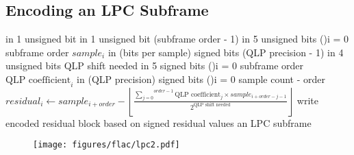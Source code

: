 \subsection{Encoding an LPC Subframe}
 in 1 unsigned bit
 in 1 unsigned bit
\WRITE (subframe order - 1) in 5 unsigned bits\;
\For(){i = 0 \emph{\KwTo}subframe order}{
  \WRITE $sample_i$ in (bits per sample) signed bits\;
}
\WRITE (QLP precision - 1) in 4 unsigned bits\;
\WRITE QLP shift needed in 5 signed bits\;
\For(){i = 0 \emph{\KwTo}subframe order}{
  \WRITE $\text{QLP coefficient}_i$ in (QLP precision) signed bits\;
}
\BlankLine
\For(){i = 0 \emph{\KwTo}sample count - order}{
  $residual_i \leftarrow sample_{i + order} - \left \lfloor \frac{\overset{order - 1}{\underset{j = 0}{\sum}} \text{QLP coefficient}_j \times sample_{i + order - j - 1} }{2 ^ \text{QLP shift needed}} \right \rfloor$
}
write encoded residual block based on signed residual values\;
\Return an LPC subframe\;
\EALGORITHM
\begin{figure}[h]
\texttt{[image: figures/flac/lpc2.pdf]}
\end{figure}

\clearpage

